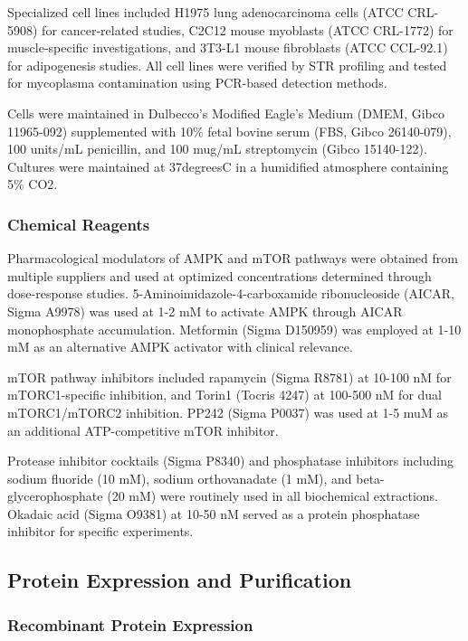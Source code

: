 \documentclass[11pt,a4paper]{article}
\begin{document}
Specialized cell lines included H1975 lung adenocarcinoma cells (ATCC CRL-5908) for cancer-related studies, C2C12 mouse myoblasts (ATCC CRL-1772) for muscle-specific investigations, and 3T3-L1 mouse fibroblasts (ATCC CCL-92.1) for adipogenesis studies. All cell lines were verified by STR profiling and tested for mycoplasma contamination using PCR-based detection methods.

Cells were maintained in Dulbecco's Modified Eagle's Medium (DMEM, Gibco 11965-092) supplemented with 10\% fetal bovine serum (FBS, Gibco 26140-079), 100 units/mL penicillin, and 100 mug/mL streptomycin (Gibco 15140-122). Cultures were maintained at 37degreesC in a humidified atmosphere containing 5\% CO2.

\subsubsection{Chemical Reagents}

Pharmacological modulators of AMPK and mTOR pathways were obtained from multiple suppliers and used at optimized concentrations determined through dose-response studies. 5-Aminoimidazole-4-carboxamide ribonucleoside (AICAR, Sigma A9978) was used at 1-2 mM to activate AMPK through AICAR monophosphate accumulation. Metformin (Sigma D150959) was employed at 1-10 mM as an alternative AMPK activator with clinical relevance.

mTOR pathway inhibitors included rapamycin (Sigma R8781) at 10-100 nM for mTORC1-specific inhibition, and Torin1 (Tocris 4247) at 100-500 nM for dual mTORC1/mTORC2 inhibition. PP242 (Sigma P0037) was used at 1-5 muM as an additional ATP-competitive mTOR inhibitor.

Protease inhibitor cocktails (Sigma P8340) and phosphatase inhibitors including sodium fluoride (10 mM), sodium orthovanadate (1 mM), and beta-glycerophosphate (20 mM) were routinely used in all biochemical extractions. Okadaic acid (Sigma O9381) at 10-50 nM served as a protein phosphatase inhibitor for specific experiments.

\subsection{Protein Expression and Purification}

\subsubsection{Recombinant Protein Expression}
\end{document}
